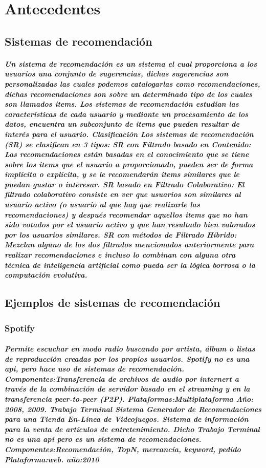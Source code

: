 \chapter {Antecedentes}
\section {Sistemas de recomendación}
  \paragraph {Un sistema de recomendaci\'on es un sistema el cual proporciona a los usuarios una conjunto de sugerencias, dichas sugerencias son personalizadas las cuales podemos catalogarlas como recomendaciones, dichas recomendaciones son sobre un determinado tipo de los cuales son llamados items. Los sistemas de recomendaci\'on estudian las caracter\'isticas de cada usuario y mediante un procesamiento de los datos, encuentra un subconjunto de items que pueden resultar de inter\'es para el usuario. Clasificaci\'on Los sistemas de recomendaci\'on (SR) se clasifican en 3 tipos: SR con Filtrado basado en Contenido: Las recomendaciones est\'an basadas en el conocimiento que se tiene sobre los items que el usuario a proporcionado, pueden ser de forma impl\'icita o expl\'icita, y se le recomendar\'an items similares que le puedan gustar o interesar. SR basado en Filtrado Colaborativo: El filtrado colaborativo consiste en ver que usuarios son similares al usuario activo (o usuario al que hay que realizarle las recomendaciones) y despu\'es recomendar aquellos items que no han sido votados por el usuario activo y que han resultado bien valorados por los usuarios similares. SR con m\'etodos de Filtrado H\'ibrido: Mezclan alguno de los dos filtrados mencionados anteriormente para realizar recomendaciones e incluso lo combinan con alguna otra t\'ecnica de inteligencia artificial como pueda ser la l\'ogica borrosa o la computaci\'on evolutiva.}

\section {Ejemplos de sistemas de recomendación}
  \subsection {Spotify}
    \paragraph {Permite escuchar en modo radio buscando por artista, álbum o listas de reproducción creadas por los propios usuarios. Spotify no es una api, pero hace uso de sistemas de recomendación. Componentes:Transferencia de archivos de audio por internert a través de la combinación de servidor basado en el streaming y en la transferencia peer-to-peer (P2P). Plataformas:Multiplataforma Año: 2008, 2009. Trabajo Terminal Sistema Generador de Recomendaciones para una Tienda En-Línea de Videojuegos.\cite{5} Sistema de información para la venta de artículos de entretenimiento. Dicho Trabajo Terminal no es una api pero es un sistema de recomendaciones. Componentes:Recomendación, TopN, mercancía, keyword, pedido Plataforma:web. año:2010}

